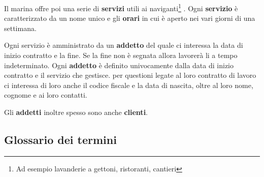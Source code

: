 Il marina offre poi una serie di \textbf{servizi} utili ai naviganti\footnote{Ad esempio lavanderie a gettoni, ristoranti, cantieri} . Ogni \textbf{servizio} è caratterizzato da un nome unico e gli \textbf{orari} in cui è aperto nei vari giorni di una settimana.

Ogni servizio è amministrato da un \textbf{addetto} del quale ci interessa la data di inizio contratto e la fine. Se la fine non è segnata allora lavorerà li a tempo indeterminato. Ogni \textbf{addetto} è definito univocamente dalla data di inizio contratto e il servizio che gestisce. per questioni legate al loro contratto di lavoro ci interessa di loro anche il codice fiscale e la data di nascita, oltre al loro nome, cognome e ai loro contatti.

Gli \textbf{addetti} inoltre spesso sono anche \textbf{clienti}.

\subsection{Glossario dei termini}

